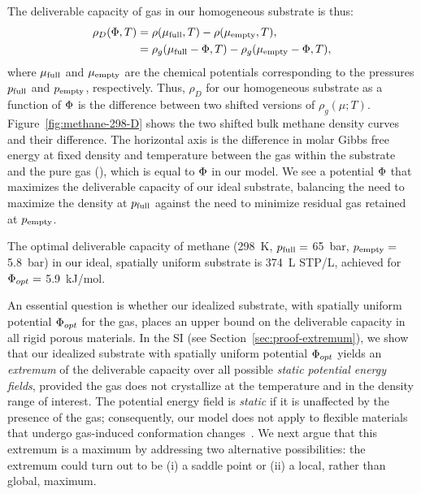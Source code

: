 The deliverable capacity of gas in our homogeneous substrate is thus:
\begin{align}
    \rho_D(\Phi,T) &= \rho(\mu_{\text{full}},T) - \rho(\mu_{\text{empty}},T),
    \label{eq:DofPhi}
    \\
    &= \rho_g(\mu_{\text{full}}-\Phi,T) - \rho_g(\mu_{\text{empty}}-\Phi,T),
\end{align}
where $\mu_{\text{full}}$ and $\mu_{\text{empty}}$ are the chemical potentials corresponding to the
pressures $p_{\text{full}}$ and $p_{\text{empty}}$, respectively. Thus, $\rho_D$ for our
homogeneous substrate as a function of $\Phi$ is the difference between two
shifted versions of $\rho_g(\mu; T)$. Figure~\ref{fig:methane-298-D} shows the
two shifted bulk methane density curves and their difference. The horizontal
axis is the difference in molar Gibbs free energy at fixed density and
temperature between the gas within the substrate and the pure gas (\gst), which
is equal to $\Phi$ in our model. We see a potential $\Phi$ that maximizes the
deliverable capacity of our ideal substrate, balancing the need to maximize the
density at $p_{\text{full}}$ against the need to minimize residual gas retained at
$p_{\text{empty}}$.

The optimal deliverable capacity of methane (298\ K, $p_{\text{full}}=$ 65\ bar,
$p_{\text{empty}}=$ 5.8\ bar) in our ideal, spatially uniform substrate is 374\ L STP/L,
achieved for $\Phi_{opt} =$ 5.9\ kJ/mol.

An essential question is whether our idealized substrate, with spatially
uniform potential $\Phi_{opt}$ for the gas, places an upper bound on the
deliverable capacity in all rigid porous materials. In the SI (see
Section~\ref{sec:proof-extremum}), we show that our idealized substrate with
spatially uniform potential $\Phi_{opt}$ yields an \emph{extremum} of the
deliverable capacity over all possible \emph{static potential energy fields},
provided the gas does not crystallize at the temperature and in the density
range of interest. The potential energy field is \emph{static} if it is
unaffected by the presence of the gas; consequently, our model does not apply
to flexible materials that undergo gas-induced conformation
changes~\cite{schneemann2014flexible}. We next argue that this extremum is a
maximum by addressing two alternative possibilities: the extremum could turn
out to be (i) a saddle point or (ii) a local, rather than global, maximum.

